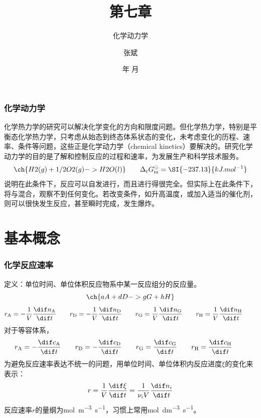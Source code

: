 \documentclass[dvipsnames, svgnames, x11names]{beamer}
\title{第七章}
\subtitle{化学动力学}
\author{张斌}
\institute[理工系]{河北农业大学 理工系}
\date{\the\year 年 \the\month 月}
\begin{document}
\begin{frame}
	\titlepage
	\thispagestyle{empty}
	\addtocounter{framenumber}{-1}
\end{frame}

    \begin{frame}
        \frametitle{化学动力学}
    
        化学热力学的研究可以解决化学变化的方向和限度问题。但化学热力学，特别是平衡态化学热力学，只考虑从始态到终态体系状态的变化，未考虑变化的历程、速率、条件等问题，这些正是化学动力学（chemical kinetics）要解决的。研究化学动力学的目的是了解和控制反应的过程和速率，为发展生产和科学技术服务。
        \[
            \ch{H2 (g) + 1/2 O2 (g) -> H2O (l)} \qquad \Delta_\mathrm{r}G_\mathrm{m}^\ominus = \SI{-237.13}{kJ.mol^{-1}}
        \]
        说明在此条件下，反应可以自发进行，而且进行得很完全。但实际上在此条件下，将与混合，观察不到任何变化。若改变条件，如升高温度，或加入适当的催化剂，则可以很快发生反应，甚至瞬时完成，发生爆炸。
    
    \end{frame}

	\begin{frame}{}
        \begin{center}
            {\Huge {}}
        \end{center}
		\tableofcontents
		\thispagestyle{empty}
		\addtocounter{framenumber}{-1}
	\end{frame}



    \section{基本概念}


    \begin{frame}
        \frametitle{化学反应速率}
    
        定义：单位时间、单位体积反应物系中某一反应组分的反应量。
        \[
            \ch{a A + d D -> g G + h H}
        \]
        \[
            r_\mathrm{A} = -\frac{1}{V}\frac{\dif n_\mathrm{A}}{\dif t} \qquad r_\mathrm{D} = -\frac{1}{V}\frac{\dif n_\mathrm{D}}{\dif t} \qquad r_\mathrm{G} = \frac{1}{V}\frac{\dif n_\mathrm{G}}{\dif t} \qquad 
            r_\mathrm{H} = \frac{1}{V}\frac{\dif n_\mathrm{H}}{\dif t} \qquad 
        \]
        对于等容体系，
        \[
            r_\mathrm{A} = -\frac{\dif c_\mathrm{A}}{\dif t} \qquad r_\mathrm{D} = -\frac{\dif c_\mathrm{D}}{\dif t} \qquad r_\mathrm{G} = \frac{\dif c_\mathrm{G}}{\dif t} \qquad 
            r_\mathrm{H} = \frac{\dif c_\mathrm{H}}{\dif t} \qquad 
        \]
        为避免反应速率表达不统一的问题，用单位时间、单位体积内反应进度$\xi$的变化来表示：
        \[
            r= \frac{1}{V}\frac{\dif \xi}{\dif t}  = \frac{1}{\nu_i V}\frac{\dif n_i}{\dif t}
        \]
        反应速率$r$的量纲为\si{mol.m^{-3}.s^{-1}}，习惯上常用\si{mol.dm^{-3}.s^{-1}}。
    
    \end{frame}
\end{document}

